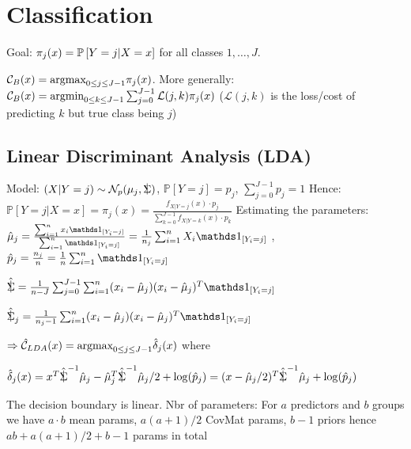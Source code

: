 \section{Classification}

Goal: $\pi_j(x) = \mathbb{P} \left[ Y=j | X=x \right]$ for all classes $1,\dots,J$.

\vspace{5pt}

$\mathcal{C}_B (x) = \text{argmax}_{0 \leq j \leq J-1} \pi_j (x)$. More generally: $\mathcal{C}_B (x) = \text{argmin}_{0 \leq k \leq J-1} \sum_{j=0}^{J-1} \mathcal{L}(j,k) \pi_j (x)$ ($\mathcal{L}(j,k)$ is the loss/cost of predicting $k$ but true class being $j$)

\vspace{-5pt}

\subsection{Linear Discriminant Analysis (LDA)}
Model: $(X|Y=j) \sim \mathcal{N}_p (\mu_j,\SigmaCov)$, $\mathbb{P}[Y=j] = p_j$, $\sum_{j=0}^{J-1} p_j = 1$
Hence: $\mathbb{P}[Y=j | X=x] = \pi_j (x) = \frac{f_{X|Y=j} (x) \cdot p_j}{\sum_{k=0}^{J-1} f_{X|Y=k} (x) \cdot p_k}$
Estimating the parameters:
$\hat{\mu}_j = \frac{\sum_{i=1}^n x_i \id_{[Y_i = j]}}{\sum_{i=1}^n \id_{[Y_i = j]}} = \frac{1}{n_j} \sum_{i=1}^n X_i \id_{[Y_i = j]}$ ,
$\hat{p}_j = \frac{n_j}{n} = \frac{1}{n} \sum_{i=1}^n \id_{[Y_i = j]}$

$\hat{\SigmaCov} = \frac{1}{n-J} \sum_{j=0}^{J-1} \sum_{i=1}^n (x_i - \hat{\mu}_j) (x_i - \hat{\mu}_j)^T \id_{[Y_i = j]}$

$\hat{\SigmaCov}_j = \frac{1}{n_j -1} \sum_{i=1}^n (x_i - \hat{\mu}_j) (x_i - \hat{\mu}_j)^T \id_{[Y_i = j]}$

$\Rightarrow \hat{\mathcal{C}}_{LDA} (x) = \text{argmax}_{0 \leq j \leq J-1} \hat{\delta}_j (x)$ where

$\hat{\delta}_j (x) = x^T \hat{\SigmaCov}^{-1} \hat{\mu}_j - \hat{\mu}_j^T \hat{\SigmaCov}^{-1} \hat{\mu}_j /2 + \log(\hat{p}_j)
= (x-\hat{\mu}_j / 2)^T \hat{\SigmaCov}^{-1} \hat{\mu}_j + \log(\hat{p}_j)$

The decision boundary is linear.
Nbr of parameters: For $a$ predictors and $b$ groups we have $a \cdot b$ mean params, $a(a+1)/2$ CovMat params, $b-1$ priors hence $a b + a(a+1)/2 + b-1$ params in total

\vspace{-5pt}

